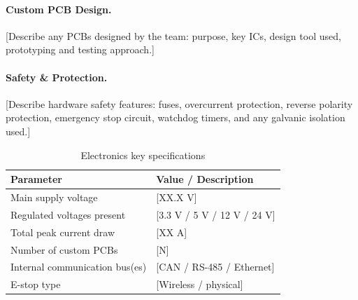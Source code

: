 \paragraph{Custom PCB Design.}
[Describe any PCBs designed by the team: purpose, key ICs, design tool used,
prototyping and testing approach.]

\paragraph{Safety \& Protection.}
[Describe hardware safety features: fuses, overcurrent protection, reverse
polarity protection, emergency stop circuit, watchdog timers, and any
galvanic isolation used.]

\begin{table}[H]
    \centering
    \caption{Electronics key specifications}
    \label{tab:elec_specs}
    \begin{tabular}{L{5cm} L{7cm}}
        \toprule
        \textbf{Parameter}             & \textbf{Value / Description} \\
        \midrule
        Main supply voltage            & [XX.X V] \\
        Regulated voltages present     & [3.3 V / 5 V / 12 V / 24 V] \\
        Total peak current draw        & [XX A] \\
        Number of custom PCBs          & [N] \\
        Internal communication bus(es) & [CAN / RS-485 / Ethernet] \\
        E-stop type                    & [Wireless / physical] \\
        \bottomrule
    \end{tabular}
\end{table}
